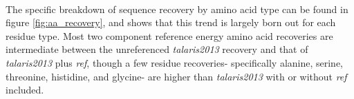 \paragraph{}
The specific breakdown of sequence recovery by amino acid type can be found in figure \ref{fig:aa_recovery}, and shows that this trend is largely born out for each residue type.
Most two component reference energy amino acid recoveries are intermediate between the unreferenced \textit{talaris2013} recovery and that of \textit{talaris2013} plus \textit{ref}, though a few residue recoveries- specifically alanine, serine, threonine, histidine, and glycine- are higher than \textit{talaris2013} with or without \textit{ref} included.





